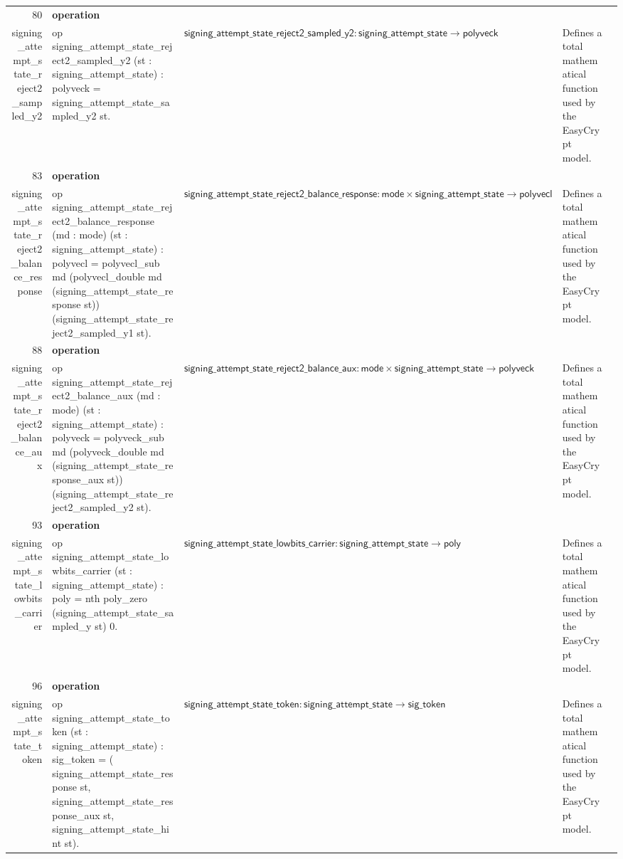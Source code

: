 \documentclass[10pt]{article}
\newcommand{\ec}[1]{\begingroup\ttfamily\scriptsize #1\endgroup}
\begin{document}
\begin{longtable}{r L{0.17\textwidth} L{0.26\textwidth} L{0.27\textwidth} L{0.20\textwidth}}
80 & \textbf{operation}\\\ec{signing\_attempt\_state\_reject2\_sampled\_y2} & \ec{op signing\_attempt\_state\_reject2\_sampled\_y2 (st : signing\_attempt\_state) : polyveck = signing\_attempt\_state\_sampled\_y2 st.} & \(\mathsf{signing\_attempt\_state\_reject2\_sampled\_y2} : \mathsf{signing\_attempt\_state} \to \mathsf{polyveck}\) & Defines a total mathematical function used by the EasyCrypt model. \\
83 & \textbf{operation}\\\ec{signing\_attempt\_state\_reject2\_balance\_response} & \ec{op signing\_attempt\_state\_reject2\_balance\_response (md : mode) (st : signing\_attempt\_state) : polyvecl = polyvecl\_sub md (polyvecl\_double md (signing\_attempt\_state\_response st)) (signing\_attempt\_state\_reject2\_sampled\_y1 st).} & \(\mathsf{signing\_attempt\_state\_reject2\_balance\_response} : \mathsf{mode} \times \mathsf{signing\_attempt\_state} \to \mathsf{polyvecl}\) & Defines a total mathematical function used by the EasyCrypt model. \\
88 & \textbf{operation}\\\ec{signing\_attempt\_state\_reject2\_balance\_aux} & \ec{op signing\_attempt\_state\_reject2\_balance\_aux (md : mode) (st : signing\_attempt\_state) : polyveck = polyveck\_sub md (polyveck\_double md (signing\_attempt\_state\_response\_aux st)) (signing\_attempt\_state\_reject2\_sampled\_y2 st).} & \(\mathsf{signing\_attempt\_state\_reject2\_balance\_aux} : \mathsf{mode} \times \mathsf{signing\_attempt\_state} \to \mathsf{polyveck}\) & Defines a total mathematical function used by the EasyCrypt model. \\
93 & \textbf{operation}\\\ec{signing\_attempt\_state\_lowbits\_carrier} & \ec{op signing\_attempt\_state\_lowbits\_carrier (st : signing\_attempt\_state) : poly = nth poly\_zero (signing\_attempt\_state\_sampled\_y st) 0.} & \(\mathsf{signing\_attempt\_state\_lowbits\_carrier} : \mathsf{signing\_attempt\_state} \to \mathsf{poly}\) & Defines a total mathematical function used by the EasyCrypt model. \\
96 & \textbf{operation}\\\ec{signing\_attempt\_state\_token} & \ec{op signing\_attempt\_state\_token (st : signing\_attempt\_state) : sig\_token = ( signing\_attempt\_state\_response st, signing\_attempt\_state\_response\_aux st, signing\_attempt\_state\_hint st).} & \(\mathsf{signing\_attempt\_state\_token} : \mathsf{signing\_attempt\_state} \to \mathsf{sig\_token}\) & Defines a total mathematical function used by the EasyCrypt model. \\

\end{longtable}
\end{document}
